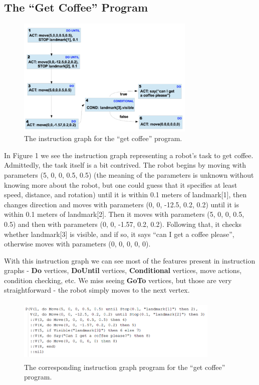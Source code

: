 \documentclass{sig-alternate-05-2015}
\begin{document}
\subsection{The ``Get Coffee'' Program}

\begin{figure}
\centering
\includegraphics[height=2.233in, width=3.346in]{images/getcoffee-ig.png}
\caption{The instruction graph for the ``get coffee'' program.}
\end{figure}

In Figure 1 we see the instruction graph representing a robot's task to get
coffee. Admittedly, the task itself is a bit contrived. The robot begins by
moving with parameters (5, 0, 0, 0.5, 0.5) (the meaning of the parameters is
unknown without knowing more about the robot, but one could guess that it
specifies at least speed, distance, and rotation) until it is within 0.1 meters
of landmark[1], then changes direction and moves with parameters (0, 0, -12.5,
0.2, 0.2) until it is within 0.1 meters of landmark[2]. Then it moves with
parameters (5, 0, 0, 0.5, 0.5) and then with parameters (0, 0, -1.57, 0.2, 0.2).
Following that, it checks whether landmark[3] is visible, and if so, it says
``can I get a coffee please'', otherwise moves with parameters (0, 0, 0, 0, 0).

With this instruction graph we can see most of the features present in
instruction graphs - \textbf{Do} vertices, \textbf{DoUntil} vertices,
\textbf{Conditional} vertices, move actions, condition checking, etc. We miss
seeing \textbf{GoTo} vertices, but those are very straightforward - the robot
simply moves to the next vertex.

\begin{figure}
\centering
\includegraphics[height=1.2in, width=3.8115in]{images/getcoffee-igprog.png}
\caption{The corresponding instruction graph program for the ``get coffee''
  program.}
\end{figure}
\end{document}
